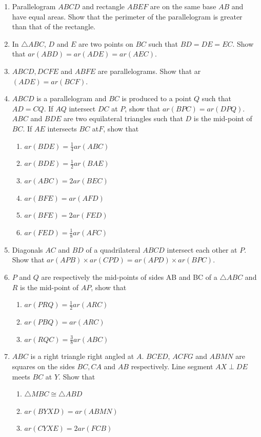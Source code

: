 \begin{enumerate}[label=\arabic*.,ref=\thesubsection.\theenumi]
\item Parallelogram $ABCD$ and rectangle $ABEF$ are on the same base $AB$ and have equal areas. Show that the perimeter of the parallelogram is greater than that of the rectangle.
\item  In $\triangle ABC$,  $D$ and $E$ are two points on $BC$ such that $BD = DE = EC$. Show that $ar (ABD) = ar (ADE) = ar (AEC)$.
\item $ABCD, DCFE$ and $ABFE$ are parallelograms. Show that ar$ (ADE) = ar (BCF)$.
\item  $ABCD$ is a parallelogram and $BC$ is produced to a point $Q$ such that $AD = CQ$. If $AQ$ intersect $DC$ at $P$, show that $ar (BPC) = ar (DPQ)$.
$ABC$ and $BDE$ are two equilateral triangles such that $D$ is the mid-point of $BC$. If $AE$ intersects $BC$ at$ F$, show that 
\begin{enumerate}
\item $ar (BDE) = \frac{1}{ 4} ar (ABC)$
\item $ar (BDE) = \frac{1}{ 2} ar (BAE)$
\item $ar (ABC) = 2 ar (BEC)$
 \item $ar (BFE) = ar (AFD)$ 
\item $ar (BFE) = 2 ar (FED)$
\item $ar (FED) =
\frac{1}{ 8}
ar (AFC)$
\end{enumerate}
\item Diagonals $AC$ and $BD$ of a quadrilateral $ABCD$ intersect each other at $P$. Show that $ar (APB)  \times  ar (CPD) = ar (APD)  \times  ar (BPC)$.
\item  $P$ and $Q$ are respectively the mid-points of sides AB and BC of a $\triangle ABC$ and $R$ is the mid-point of $AP$, show that 
\begin{enumerate}
\item $ar (PRQ) = \frac{1 }{2}ar (ARC) $
\item $ar (PBQ) = ar (ARC)$
\item $ar (RQC) =
\frac{3}{ 8}
ar (ABC)$
\end{enumerate}
%
\item $ABC$ is a right triangle right angled at $A$. $BCED$, $ACFG$ and $ABMN$ are
squares on the sides $BC, CA$ and $AB$ respectively. Line segment $AX \perp  DE$ meets $BC$ at $Y$. Show that 
\begin{enumerate}
\item $ \triangle  MBC \cong  \triangle  ABD$
\item $ar (BYXD) = ar (ABMN)$ \item $ar (CYXE) = 2 ar (FCB)$

\end{enumerate}
\end{enumerate}
